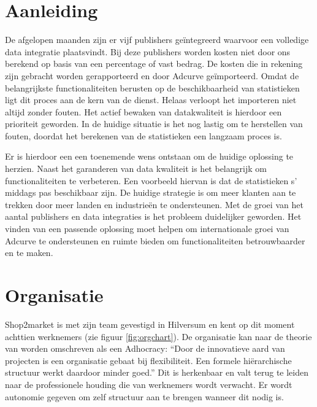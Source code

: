 \pagebreak

\section{Aanleiding} %

De afgelopen maanden zijn er vijf publishers geïntegreerd waarvoor een volledige data integratie plaatsvindt. Bij deze publishers worden kosten niet door ons berekend op basis van een percentage of vast bedrag. De kosten die in rekening zijn gebracht worden gerapporteerd en door Adcurve geïmporteerd.
Omdat de belangrijkste functionaliteiten berusten op de beschikbaarheid van statistieken ligt dit proces aan de kern van de dienst. Helaas verloopt het importeren niet altijd zonder fouten. Het actief bewaken van datakwaliteit is hierdoor een prioriteit geworden. In de huidige situatie is het nog lastig om te herstellen van fouten, doordat het berekenen van de statistieken een langzaam proces is.

Er is hierdoor een een toenemende wens ontstaan om de huidige oplossing te herzien. Naast het garanderen van data kwaliteit is het belangrijk om functionaliteiten te verbeteren. Een voorbeeld hiervan is dat de statistieken s' middags pas beschikbaar zijn. De huidige strategie is om meer klanten aan te trekken door meer landen en industrieën te ondersteunen. Met de groei van het aantal publishers en data integraties is het probleem duidelijker geworden. Het vinden van een passende oplossing moet helpen om internationale groei van Adcurve te ondersteunen en ruimte bieden om functionaliteiten betrouwbaarder en te maken.

\section{Organisatie} %

Shop2market is met zijn team gevestigd in Hilversum en kent op dit moment achttien werknemers (zie figuur \ref{fig:orgchart}). De organisatie kan naar de theorie van
\autocite{mintzberg} worden omschreven als een Adhocracy: “Door de innovatieve aard van projecten is een organisatie gebaat bij flexibiliteit. Een formele hiërarchische structuur werkt daardoor minder goed.” Dit is herkenbaar en valt terug te leiden naar de professionele houding die van werknemers wordt verwacht. Er wordt autonomie gegeven om zelf structuur aan te brengen wanneer dit nodig is.


